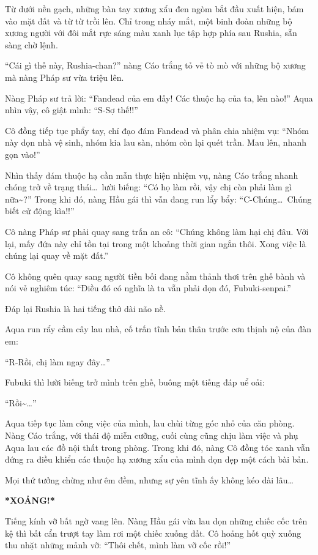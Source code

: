 \documentclass[../main.tex]{subfiles}
\begin{document}
Từ dưới nền gạch, những bàn tay xương xẩu đen ngòm bắt đầu xuất hiện, bám vào mặt đất và từ từ trồi lên. Chỉ trong nháy mắt, một binh đoàn những bộ xương người với đôi mắt rực sáng màu xanh lục tập hợp phía sau Rushia, sẵn sàng chờ lệnh.

``Cái gì thế này, Rushia-chan?'' nàng Cáo trắng tỏ vẻ tò mò với những bộ xương mà nàng Pháp sư vừa triệu lên.

Nàng Pháp sư trả lời: ``Fandead của em đấy! Các thuộc hạ của ta, lên nào!'' Aqua nhìn vậy, cô giật mình: ``S-Sợ thế!!''

Cô đồng tiếp tục phẩy tay, chỉ đạo đám Fandead và phân chia nhiệm vụ: ``Nhóm này dọn nhà vệ sinh, nhóm kia lau sàn, nhóm còn lại quét trần. Mau lên, nhanh gọn vào!''

Nhìn thấy đám thuộc hạ cần mẫn thực hiện nhiệm vụ, nàng Cáo trắng nhanh chóng trở về trạng thái\dots\ lười biếng: ``Có họ làm rồi, vậy chị còn phải làm gì nữa\~{}?'' Trong khi đó, nàng Hầu gái thì vẫn đang run lẩy bẩy: ``C-Chúng\dots\ Chúng biết cử động kìa!!''

Cô nàng Pháp sư phải quay sang trấn an cô: ``Chúng không làm hại chị đâu. Với lại, mấy đứa này chỉ tồn tại trong một khoảng thời gian ngắn thôi. Xong việc là chúng lại quay về mặt đất.''

Cô không quên quay sang người tiền bối đang nằm thảnh thơi trên ghế bành và nói vẻ nghiêm túc: ``Điều đó có nghĩa là ta vẫn phải dọn đó, Fubuki-senpai.''

Đáp lại Rushia là hai tiếng thở dài não nề.

Aqua run rẩy cầm cây lau nhà, cố trấn tĩnh bản thân trước cơn thịnh nộ của đàn em:

``R-Rồi, chị làm ngay đây\dots''

Fubuki thì lười biếng trở mình trên ghế, buông một tiếng đáp uể oải:

``Rồi\~{}\dots''

\ct

Aqua tiếp tục làm công việc của mình, lau chùi từng góc nhỏ của căn phòng. Nàng Cáo trắng, với thái độ miễn cưỡng, cuối cùng cũng chịu làm việc và phụ Aqua lau các đồ nội thất trong phòng. Trong khi đó, nàng Cô đồng tóc xanh vẫn đứng ra điều khiển các thuộc hạ xương xẩu của mình dọn dẹp một cách bài bản.

Mọi thứ tưởng chừng như êm đềm, nhưng sự yên tĩnh ấy không kéo dài lâu\dots

\textbf{*XOẢNG!*}

Tiếng kính vỡ bất ngờ vang lên. Nàng Hầu gái vừa lau dọn những chiếc cốc trên kệ thì bất cẩn trượt tay làm rơi một chiếc xuống đất. Cô hoảng hốt quỳ xuống thu nhặt những mảnh vỡ: ``Thôi chết, mình làm vỡ cốc rồi!''
\end{document}
